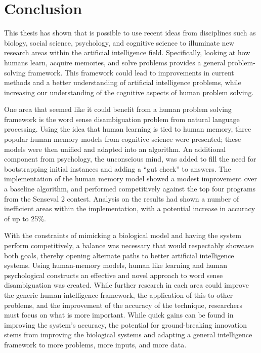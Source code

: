 \chapter{Conclusion}

This thesis has shown that is possible to use recent ideas from disciplines such
as biology, social science, psychology, and cognitive science to illuminate new
research areas within the artificial intelligence field.  Specifically, looking
at how humans learn, acquire memories, and solve problems provides a general
problem-solving framework.  This framework could lead to improvements in current
methods and a better understanding of artificial intelligence problems, while
increasing our understanding of the cognitive aspects of human problem solving.

One area that seemed like it could benefit from a human problem solving
framework is the word sense disambiguation problem from natural language
processing. Using the idea that human learning is tied to human memory, three
popular human memory models from cognitive science were presented; these models
were then unified and adapted into an algorithm.  An additional component from
psychology, the unconscious mind, was added to fill the need for bootstrapping
initial instances and adding a ``gut check'' to answers. The implementation of
the human memory model showed a modest improvement over a baseline algorithm,
and performed competitively against the top four programs from the Senseval 2
contest.  Analysis on the results had shown a number of inefficient areas within
the implementation, with a potential increase in accuracy of up to 25\%.

With the constraints of mimicking a biological model and having the system
perform competitively, a balance was necessary that would respectably showcase
both goals, thereby  opening alternate paths to better artificial intelligence
systems. Using human-memory models, human like learning and human psychological
constructs an effective and novel approach to word sense disambiguation was
created.  While further research in each area could improve the generic human
intelligence framework, the application of this to other problems, and the
improvement of the accuracy of the technique, researchers must focus on what is
more important.  While quick gains can be found in improving the system's
accuracy, the potential for ground-breaking innovation stems from improving the
biological systems and adapting a general intelligence framework to more
problems, more inputs, and more data.

